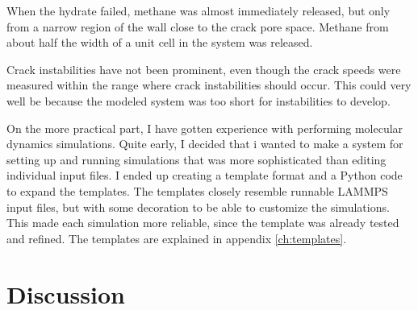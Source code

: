 When the hydrate failed, methane was almost immediately released, but only from a narrow region of the wall close to the crack pore space. Methane from about half the width of a unit cell in the system was released.

Crack instabilities have not been prominent, even though the crack speeds were measured within the range where crack instabilities should occur. This could very well be because the modeled system was too short for instabilities to develop.

On the more practical part, I have gotten experience with performing molecular dynamics simulations. Quite early, I decided that i wanted to make a system for setting up and running simulations that was more sophisticated than editing individual input files. I ended up creating a template format and a Python code to expand the templates. The templates closely resemble runnable LAMMPS input files, but with some decoration to be able to customize the simulations. This made each simulation more reliable, since the template was already tested and refined. The templates are explained in appendix \ref{ch:templates}.


\section{Discussion}

